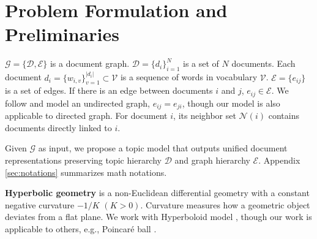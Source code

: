\section{Problem Formulation and Preliminaries}


$ \mathcal{G}=\{\mathcal{D},\mathcal{E}\} $ is a document graph. $ \mathcal{D}=\{d_i\}_{i=1}^N $ is a set of $ N $ documents. Each document $ d_i=\{w_{i,v}\}_{v=1}^{|d_i|}\subset\mathcal{V} $ is a sequence of words in vocabulary $ \mathcal{V} $. $ \mathcal{E}=\{e_{ij}\} $ is a set of edges. If there is an edge between documents $ i $ and $ j $, $ e_{ij}\in\mathcal{E} $. We follow \cite{hgtm} and model an undirected graph, $ e_{ij}=e_{ji} $, though our model is also applicable to directed graph. %
For document $ i $, its neighbor set $ \mathcal{N}(i) $ contains documents directly linked to $ i $.

Given $ \mathcal{G} $ as input, we propose a topic model that outputs unified document representations preserving topic hierarchy $ \mathcal{D} $ and graph hierarchy $ \mathcal{E} $. %
Appendix \ref{sec:notations} summarizes math notations.

\textbf{Hyperbolic geometry} is a non-Euclidean differential geometry with a constant negative curvature $ -1/K $ $ (K>0) $. Curvature measures how a geometric object deviates from a flat plane. %
We work with Hyperboloid model \cite{hyperboloid_model}, though our work is applicable to others, e.g., Poincar{\'e} ball \cite{poincare_model}.

